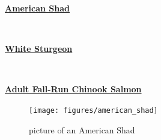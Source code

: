 \documentclass[
]{book}
\begin{document}
\begin{panel-grid}

\begin{columns-nocenter}

\begin{column800}

\textbf{\href{http://calfish.ucdavis.edu/species/?uid=3\&ds=698}{American Shad}}

\end{column800}

\begin{column40}

~

\end{column40}

\begin{column800}

\textbf{\href{http://calfish.ucdavis.edu/species/?uid=182\&ds=698}{White Sturgeon}}

\end{column800}

\begin{column40}

~

\end{column40}

\begin{column800}

\textbf{\href{http://calfish.ucdavis.edu/species/?uid=26\&ds=698}{Adult Fall-Run Chinook Salmon}}

\end{column800}

\end{columns-nocenter}

\begin{columns-nocenter}

\begin{column800}

\begin{figure}

{\centering \texttt{[image: figures/american\_shad]} 

}

\caption{picture of an American Shad}\label{fig:unnamed-chunk-127}
\end{figure}

\end{column800}

\begin{column40}

~

\end{column40}


\end{columns-nocenter}
\end{panel-grid}
\end{document}
